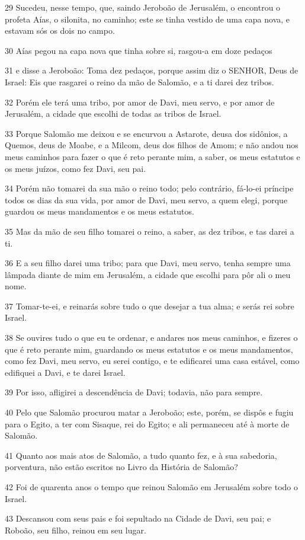 \par 29 Sucedeu, nesse tempo, que, saindo Jeroboão de Jerusalém, o encontrou o profeta Aías, o silonita, no caminho; este se tinha vestido de uma capa nova, e estavam sós os dois no campo.
\par 30 Aías pegou na capa nova que tinha sobre si, rasgou-a em doze pedaços
\par 31 e disse a Jeroboão: Toma dez pedaços, porque assim diz o SENHOR, Deus de Israel: Eis que rasgarei o reino da mão de Salomão, e a ti darei dez tribos.
\par 32 Porém ele terá uma tribo, por amor de Davi, meu servo, e por amor de Jerusalém, a cidade que escolhi de todas as tribos de Israel.
\par 33 Porque Salomão me deixou e se encurvou a Astarote, deusa dos sidônios, a Quemos, deus de Moabe, e a Milcom, deus dos filhos de Amom; e não andou nos meus caminhos para fazer o que é reto perante mim, a saber, os meus estatutos e os meus juízos, como fez Davi, seu pai.
\par 34 Porém não tomarei da sua mão o reino todo; pelo contrário, fá-lo-ei príncipe todos os dias da sua vida, por amor de Davi, meu servo, a quem elegi, porque guardou os meus mandamentos e os meus estatutos.
\par 35 Mas da mão de seu filho tomarei o reino, a saber, as dez tribos, e tas darei a ti.
\par 36 E a seu filho darei uma tribo; para que Davi, meu servo, tenha sempre uma lâmpada diante de mim em Jerusalém, a cidade que escolhi para pôr ali o meu nome.
\par 37 Tomar-te-ei, e reinarás sobre tudo o que desejar a tua alma; e serás rei sobre Israel.
\par 38 Se ouvires tudo o que eu te ordenar, e andares nos meus caminhos, e fizeres o que é reto perante mim, guardando os meus estatutos e os meus mandamentos, como fez Davi, meu servo, eu serei contigo, e te edificarei uma casa estável, como edifiquei a Davi, e te darei Israel.
\par 39 Por isso, afligirei a descendência de Davi; todavia, não para sempre.
\par 40 Pelo que Salomão procurou matar a Jeroboão; este, porém, se dispôs e fugiu para o Egito, a ter com Sisaque, rei do Egito; e ali permaneceu até à morte de Salomão.
\par 41 Quanto aos mais atos de Salomão, a tudo quanto fez, e à sua sabedoria, porventura, não estão escritos no Livro da História de Salomão?
\par 42 Foi de quarenta anos o tempo que reinou Salomão em Jerusalém sobre todo o Israel.
\par 43 Descansou com seus pais e foi sepultado na Cidade de Davi, seu pai; e Roboão, seu filho, reinou em seu lugar.

